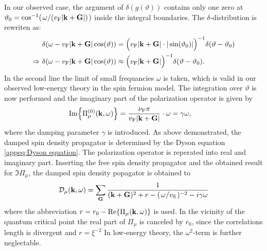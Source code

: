 In our observed case, the argument of $\delta(g(\vartheta))$ contains only one zero at $\vartheta_{0} = \cos[-1](\flatfrac{\omega}{(v_{\mt{F}} |\vb{k} + \vb{G}|)})$ inside the integral boundaries.
The $\delta$-distribution is rewriten as:
%
\begin{align}
	&\delta(\omega - v_{\mathrm{F}} |\vb{k} + \vb{G}| \cos(\vartheta)) = \Big(v_{\mathrm{F}} |\vb{k} + \vb{G}| \cdot |\sin(\vartheta_{0})|\Big)^{-1} \delta(\vartheta - \vartheta_{0})
	\notag \\
	\Rightarrow\ &\delta(\omega - v_{\mathrm{F}} |\vb{k} + \vb{G}| \cos(\vartheta)) \approx \Big(v_{\mathrm{F}} |\vb{k} + \vb{G}|\Big)^{-1} \delta(\vartheta - \vartheta_{0}).
\end{align}
%
In the second line the limit of small frequancies $\omega$ is taken, which is valid in our observed low-energy theory in the spin fermion model.
The integration over $\vartheta$ is now performed and the imaginary part of the polarization operator is given by
%
\begin{align}
	\Im{\Pi_{\mu}^{(0)}(\vb{k}, \omega)} &= \frac{\nu_{\mathrm{F}} \pi}{v_{\mathrm{F}} |\vb{k} + \vb{G}|} \cdot \omega = \gamma \omega,	 
\end{align}
%
where the damping parameter $\gamma$ is introduced.
As above demonstrated, the damped spin density propagator is determined by the Dyson equation \eqref{appeq:Dyson equation}.
The polarization operator is reperated into real and imaginary part.
Inserting the free spin density propagator and the obtained result for $\Im{\Pi_{\mu}}$, the damped spin density popagator is obtained to
%
\begin{align}
	\mathcal{D}_{\mu}(\vb{k}, \omega) = \sum\limits_{\vb{G}} \frac{1}{(\vb{k}+\vb{G})^{2} + r - (\flatfrac{\omega}{v_{\mt{S}}})^{-2} - i \gamma \omega}
	\label{appeq:damped spin density propagator with real omega}
\end{align}
%
where the abbreviation $r = r_{0} - \Re{\Pi_{\mu}(\vb{k}, \omega)}$ is used.
In the vicinity of the quantum critical point the real part of $\Pi_{\mu}$ is canceled by $r_{0}$, since the correlations length is divergent and $r=\xi^{-2}$
In low-energy theory, the $\omega^{2}$-term is further neglectable.
%
%
